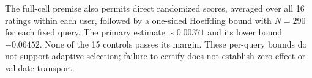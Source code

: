 The full-cell premise also permits direct randomized scores, averaged over all 16 ratings within each user, followed by a one-sided Hoeffding bound with $N=290$ for each fixed query. The primary estimate is $0.00371$ and its lower bound $-0.06452$. None of the 15 controls passes its margin. These per-query bounds do not support adaptive selection; failure to certify does not establish zero effect or validate transport.
